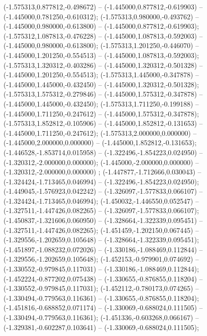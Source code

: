  (-1.575313,0.877812,-0.498672) -- (-1.445000,0.877812,-0.619903) -- (-1.445000,0.781250,-0.610312);
 (-1.575313,0.980000,-0.493762) -- (-1.445000,0.980000,-0.613800) -- (-1.445000,0.877812,-0.619903);
 (-1.575312,1.087813,-0.476228) -- (-1.445000,1.087813,-0.592003) -- (-1.445000,0.980000,-0.613800);
 (-1.575313,1.201250,-0.446070) -- (-1.445000,1.201250,-0.554513) -- (-1.445000,1.087813,-0.592003);
 (-1.575313,1.320312,-0.403286) -- (-1.445000,1.320312,-0.501328) -- (-1.445000,1.201250,-0.554513);
 (-1.575313,1.445000,-0.347878) -- (-1.445000,1.445000,-0.432450) -- (-1.445000,1.320312,-0.501328);
 (-1.575313,1.575312,-0.279846) -- (-1.445000,1.575312,-0.347878) -- (-1.445000,1.445000,-0.432450);
 (-1.575313,1.711250,-0.199188) -- (-1.445000,1.711250,-0.247612) -- (-1.445000,1.575312,-0.347878);
 (-1.575313,1.852812,-0.105906) -- (-1.445000,1.852812,-0.131653) -- (-1.445000,1.711250,-0.247612);
 (-1.575313,2.000000,0.000000) -- (-1.445000,2.000000,0.000000) -- (-1.445000,1.852812,-0.131653);
 (-1.446528,-1.853714,0.015958) -- (-1.322496,-1.854223,0.024950) -- (-1.320312,-2.000000,0.000000);
 (-1.445000,-2.000000,0.000000) -- (-1.320312,-2.000000,0.000000) ;
 (-1.447877,-1.712666,0.030043) -- (-1.324424,-1.713465,0.046994) -- (-1.322496,-1.854223,0.024950);
 (-1.449045,-1.576923,0.042242) -- (-1.326097,-1.577833,0.066107) -- (-1.324424,-1.713465,0.046994);
 (-1.450032,-1.446550,0.052547) -- (-1.327511,-1.447426,0.082265) -- (-1.326097,-1.577833,0.066107);
 (-1.450837,-1.321606,0.060950) -- (-1.328664,-1.322339,0.095451) -- (-1.327511,-1.447426,0.082265);
 (-1.451459,-1.202150,0.067445) -- (-1.329556,-1.202659,0.105648) -- (-1.328664,-1.322339,0.095451);
 (-1.451897,-1.088232,0.072026) -- (-1.330186,-1.088469,0.112844) -- (-1.329556,-1.202659,0.105648);
 (-1.452153,-0.979901,0.074692) -- (-1.330552,-0.979845,0.117031) -- (-1.330186,-1.088469,0.112844);
 (-1.452224,-0.877202,0.075438) -- (-1.330655,-0.876855,0.118204) -- (-1.330552,-0.979845,0.117031);
 (-1.452112,-0.780173,0.074265) -- (-1.330494,-0.779563,0.116361) -- (-1.330655,-0.876855,0.118204);
 (-1.451816,-0.688852,0.071174) -- (-1.330069,-0.688024,0.111505) -- (-1.330494,-0.779563,0.116361);
 (-1.451336,-0.603268,0.066167) -- (-1.329381,-0.602287,0.103641) -- (-1.330069,-0.688024,0.111505);
